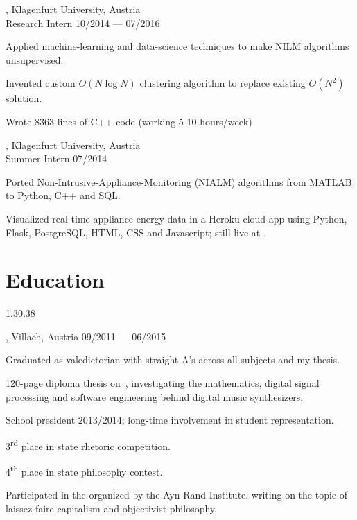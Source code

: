 \begin{entry}
	{, Klagenfurt University, Austria}
	{\\Research Intern}
	{10/2014 --- 07/2016}

\item Applied machine-learning and data-science techniques to make NILM
  algorithms unsupervised.
	\item Invented custom $O(N \log N)$ clustering algorithm to replace existing $O(N^2)$ solution.
	\item Wrote 8363 lines of C++ code (working 5-10 hours/week)
\end{entry}

\begin{entry}
	{, Klagenfurt University, Austria}
	{\\Summer Intern}
	{07/2014}

	\item Ported Non-Intrusive-Appliance-Monitoring (NIALM) algorithms from MATLAB to Python, C++ and SQL.
	\item Visualized real-time appliance energy data in a Heroku cloud app using Python, Flask, PostgreSQL, HTML, CSS and Javascript; still live at .
\end{entry}

\vspace{-2mm}
\section{Education}{1.3}{0.38}
\begin{entry}
	{, Villach, Austria}{}
	{09/2011 --- 06/2015}
	\item Graduated as valedictorian with straight A's across all subjects and my thesis.
  \item 120-page diploma thesis on  \,, investigating the mathematics, digital signal processing and software engineering behind digital music synthesizers.
	\item School president $2013/2014$; long-time involvement in student representation.
  \item 3\textsuperscript{rd} place in state rhetoric competition.
  \item 4\textsuperscript{th} place in state philosophy contest.
  \item Participated in the  organized by the Ayn Rand Institute, writing on the topic of laissez-faire capitalism and objectivist philosophy.
\end{entry}

